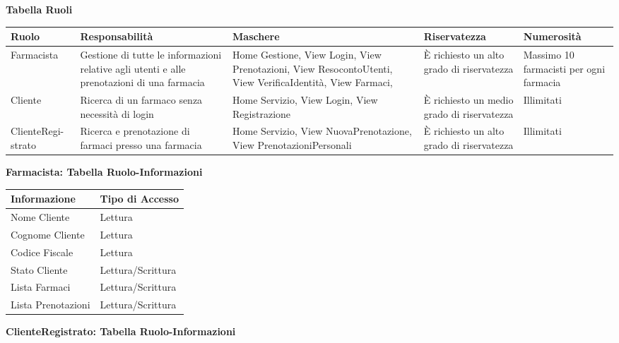 \textbf{Tabella Ruoli}
\hfill \break

\begin{tabular} {|P{2.5cm}|P{3cm}|P{3.5cm}|P{3cm}|P{3cm}|}
    \hline
    \textbf{Ruolo} & \textbf{Responsabilità} & \textbf{Maschere} & \textbf{Riservatezza} & \textbf{Numerosità} \\
    \hline
    Farmacista & Gestione di tutte le informazioni relative agli utenti e alle prenotazioni di una farmacia & Home Gestione, View Login, View Prenotazioni, View ResocontoUtenti, View VerificaIdentità, View Farmaci,  & È richiesto un alto grado di riservatezza  & Massimo 10 farmacisti per ogni farmacia \\
    \hline
    Cliente & Ricerca di un farmaco senza necessità di login & Home Servizio, View Login, View Registrazione  & È richiesto un medio grado di riservatezza & Illimitati \\
    \hline
    ClienteRegi- strato & Ricerca e prenotazione di farmaci presso una farmacia & Home Servizio, View NuovaPrenotazione, View PrenotazioniPersonali &  È richiesto un alto grado di riservatezza  & Illimitati \\
    \hline
\end{tabular}
\hfill \break
\hfill \break

\textbf{Farmacista: Tabella Ruolo-Informazioni}
\hfill \break

\begin{tabular} {|P{7cm}|P{7cm}|}
    \hline
    \textbf{Informazione} & \textbf{Tipo di Accesso} \\
    \hline
    Nome Cliente & Lettura \\
    \hline
    Cognome Cliente & Lettura \\
    \hline
    Codice Fiscale & Lettura \\
    \hline
    Stato Cliente & Lettura/Scrittura \\
    \hline
    Lista Farmaci & Lettura/Scrittura \\
    \hline
    Lista Prenotazioni & Lettura/Scrittura \\
    \hline
\end{tabular}
\hfill \break
\hfill \break

\textbf{ClienteRegistrato: Tabella Ruolo-Informazioni}
\hfill \break

